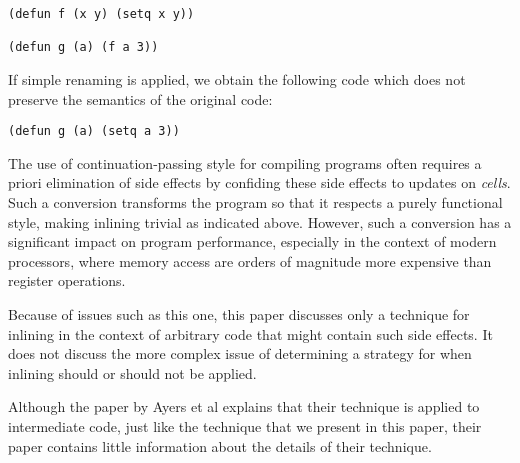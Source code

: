 \begin{verbatim}
(defun f (x y) (setq x y))

(defun g (a) (f a 3))
\end{verbatim}

If simple renaming is applied, we obtain the following code which does
not preserve the semantics of the original code:

\begin{verbatim}
(defun g (a) (setq a 3))
\end{verbatim}

\noindent
The use of continuation-passing style for compiling \commonlisp{}
programs often requires a priori elimination of side effects by
confiding these side effects to updates on \emph{cells}.  Such a
conversion transforms the program so that it respects a purely
functional style, making inlining trivial as indicated above.
However, such a conversion has a significant impact on program
performance, especially in the context of modern processors, where
memory access are orders of magnitude more expensive than register
operations.

Because of issues such as this one, this paper discusses only a
technique for inlining in the context of arbitrary \commonlisp{} code
that might contain such side effects.  It does not discuss the more
complex issue of determining a strategy for when inlining should or
should not be applied.

Although the paper by Ayers et al explains that their technique is
applied to intermediate code, just like the technique that we present
in this paper, their paper contains little information about the details
of their technique.

